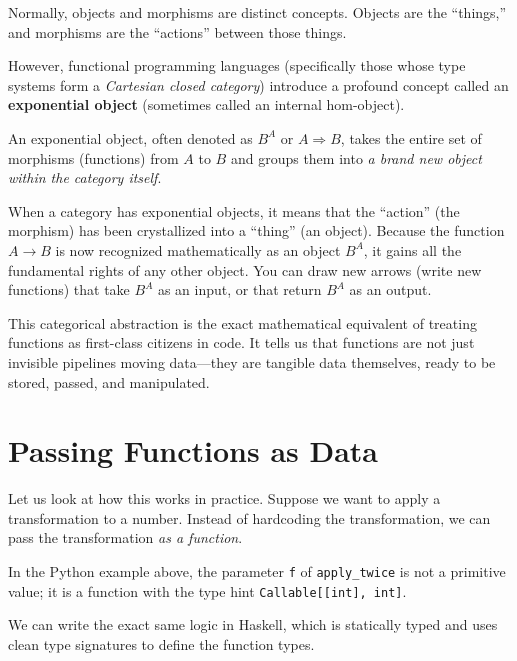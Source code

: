 Normally, objects and morphisms are distinct concepts. Objects are the ``things,'' and morphisms are the ``actions'' between those things. 

However, functional programming languages (specifically those whose type systems form a \textit{Cartesian closed category}) introduce a profound concept called an \textbf{exponential object} (sometimes called an internal hom-object). 

An exponential object, often denoted as $B^A$ or $A \Rightarrow B$, takes the entire set of morphisms (functions) from $A$ to $B$ and groups them into \textit{a brand new object within the category itself}. 

When a category has exponential objects, it means that the ``action'' (the morphism) has been crystallized into a ``thing'' (an object). Because the function $A \to B$ is now recognized mathematically as an object $B^A$, it gains all the fundamental rights of any other object. You can draw new arrows (write new functions) that take $B^A$ as an input, or that return $B^A$ as an output. 

This categorical abstraction is the exact mathematical equivalent of treating functions as first-class citizens in code. It tells us that functions are not just invisible pipelines moving data---they are tangible data themselves, ready to be stored, passed, and manipulated.

\section{Passing Functions as Data}

Let us look at how this works in practice. Suppose we want to apply a transformation to a number. Instead of hardcoding the transformation, we can pass the transformation \textit{as a function}.



In the Python example above, the parameter \texttt{f} of \texttt{apply\_twice} is not a primitive value; it is a function with the type hint \texttt{Callable[[int], int]}.

We can write the exact same logic in Haskell, which is statically typed and uses clean type signatures to define the function types.



